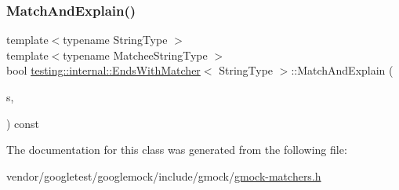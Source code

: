 \subsubsection{\texorpdfstring{Match\+And\+Explain()}{MatchAndExplain()}\hspace{0.1cm}{\footnotesize\ttfamily [2/2]}}
{\footnotesize\ttfamily template$<$typename String\+Type $>$ \\
template$<$typename Matchee\+String\+Type $>$ \\
bool \hyperlink{classtesting_1_1internal_1_1_ends_with_matcher}{testing\+::internal\+::\+Ends\+With\+Matcher}$<$ String\+Type $>$\+::Match\+And\+Explain (\begin{DoxyParamCaption}\item[{const Matchee\+String\+Type \&}]{s,  }\item[{\hyperlink{classtesting_1_1_match_result_listener}{Match\+Result\+Listener} $\ast$}]{ }\end{DoxyParamCaption}) const\hspace{0.3cm}{\ttfamily [inline]}}



The documentation for this class was generated from the following file\+:\begin{DoxyCompactItemize}
\item 
vendor/googletest/googlemock/include/gmock/\hyperlink{gmock-matchers_8h}{gmock-\/matchers.\+h}\end{DoxyCompactItemize}
